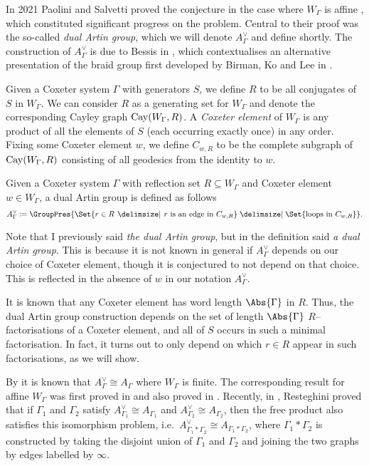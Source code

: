 In 2021 Paolini and Salvetti proved the conjecture in the case where $W_\Gamma$ is affine \cite{paolini_salvetti_kpi1_2021}, which constituted significant progress on the problem.
Central to their proof was the so-called \emph{dual Artin group}, which we will denote $A^\vee_\Gamma$ and define shortly.
The construction of $A^\vee_\Gamma$ is due to Bessis in \cite{bessis_dual_2003}, which contextualises an alternative presentation of the braid group first developed by Birman, Ko and Lee in \cite{birman_etal_new_1998}.

Given a Coxeter system $\Gamma$ with generators $S$, we define $R$ to be all conjugates of  $S$ in  $W_\Gamma$.
We can consider $R$ as a generating set for $W_\Gamma$ and denote the corresponding Cayley graph  $\operatorname{Cay}(W_\Gamma,R)$.
A \emph{Coxeter element} of  $W_\Gamma$ is any product of all the elements of $S$ (each occurring exactly once) in any order.
Fixing some Coxeter element $w$, we define $C_{w,R}$ to be the complete subgraph of $\operatorname{Cay}(W_\Gamma,R)$ consisting of all geodesics from the identity to $w$.

\begin{definition}
	\label{def:dual_artin}
	Given a Coxeter system $\Gamma$ with reflection set  $R \subseteq W_\Gamma$ and Coxeter element $w \in W_\Gamma$, a dual Artin group is defined as follows
	\[
		A^\vee_\Gamma \coloneq \GroupPres{\Set{r \in R \given r \text{ is an edge in } C_{w,R}} \relations \Set{ \text{loops in } C_{w,R}}}
		.\]
\end{definition}

Note that I previously said \emph{the dual Artin group}, but in the definition said \emph{a dual Artin group}.
This is because it is not known in general if $A^\vee_\Gamma$ depends on our choice of Coxeter element, though it is conjectured to not depend on that choice.
This is reflected in the absence of $w$ in our notation  $A^\vee_\Gamma$.

It is known that any Coxeter element has word length $\Abs{\Gamma}$ in $R$.
Thus, the dual Artin group construction depends on the set of length $\Abs{\Gamma}$ $R$--factorisations of  a Coxeter element, and all of $S$ occurs in such a minimal factorisation.
In fact, it turns out to only depend on which $r \in R$ appear in such factorisations, as we will show.

By \cite{bessis_dual_2003, brady_watt_kp_2002} it is known that $A^\vee_\Gamma \cong A_\Gamma$ where  $W_\Gamma$ is finite.
The corresponding result for affine $W_\Gamma$ was first proved in \cite{mccammond_sulway_artin_2017} and also proved in \cite{paolini_salvetti_kpi1_2021}.
Recently, in \cite{resteghini_free_2024}, Resteghini proved that if $\Gamma_1$ and  $\Gamma_2$ satisfy $A^\vee_{\Gamma_1} \cong A_{\Gamma_1}$ and $A^\vee_{\Gamma_2}\cong A_{\Gamma_2}$, then the free product also satisfies this isomorphism problem, i.e.~$A^\vee_{\Gamma_1 \ast \Gamma_2} \cong A_{\Gamma_1\ast \Gamma_2}$, where $\Gamma_1 \ast \Gamma_2$ is constructed by taking the disjoint union of $\Gamma_1$ and  $\Gamma_2$ and joining the two graphs by edges labelled by $\infty$.

